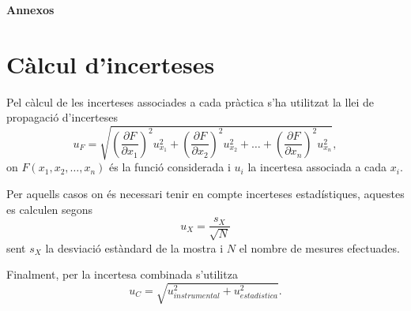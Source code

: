 \documentclass[a4paper,10.5pt]{report}
\begin{document}
\newpage
\begin{appendices}

\textbf{\Huge{Annexos}}
\renewcommand{\thesection}{\Alph{section}} %
\renewcommand{\theequation}{\thesection.\arabic{equation}} %
\setcounter{equation}{0} %

\section{Càlcul d'incerteses}
\label{an:a3}
Pel càlcul de les incerteses associades a cada pràctica s'ha utilitzat la llei de propagació d'incerteses
\begin{equation}
	u_F = \sqrt{ \left( \frac{\partial F}{\partial x_1} \right)^2 u_{x_1}^2 + \left( \frac{\partial F}{\partial x_2} \right)^2 u_{x_2}^2 + \dots + \left( \frac{\partial F}{\partial x_n} \right)^2 u_{x_n}^2 },
\end{equation}
on $F(x_1,x_2,\ldots,x_n)$ és la funció considerada i $u_i$ la incertesa associada a cada $x_i$.

Per aquells casos on és necessari tenir en compte incerteses estadístiques, aquestes es calculen segons
\begin{equation}
	u_X=\frac{s_X}{\sqrt{N}}
\end{equation}
sent $s_X$ la desviació estàndard de la mostra i $N$ el nombre de mesures efectuades.

Finalment, per la incertesa combinada s'utilitza
\begin{equation}
	u_C=\sqrt{u_{instrumental}^2+u_{estadistica}^2}.
\end{equation}


\end{appendices}
\end{document}
